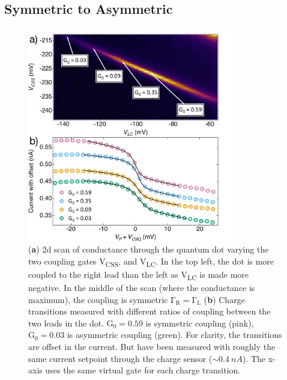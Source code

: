 \subsection{Symmetric to Asymmetric}


\begin{figure}[!bht]
 \begin{center}
 \includegraphics[width=0.8\textwidth]{figures/ch3/figure18.pdf}
 \caption[Symmetric to Asymmetric Coupling]{\label{fig:ch3/symmetry_picking} 
 (\textbf{a}) 2d scan of conductance through the quantum dot varying the two coupling gates V\textsubscript{CSS}, and V\textsubscript{LC}. In the top left, the dot is more coupled to the right lead than the left as V\textsubscript{LC} is made more negative. In the middle of the scan (where the conductance is maximum), the coupling is symmetric $\mathrm{\Gamma_R} = \mathrm{\Gamma_L}$ (\textbf{b}) Charge transitions measured with different ratios of coupling between the two leads in the dot. $\mathrm{G_0} = 0.59$ is symmetric coupling (pink), $\mathrm{G_0} = 0.03$ is asymmetric coupling (green). For clarity, the transitions are offset in the current. But have been measured with roughly the same current setpoint through the charge sensor ($\sim\qty{0.4}{nA}$). The x-axis uses the same virtual gate for each charge transition. 
 }
 \end{center}
\end{figure}


